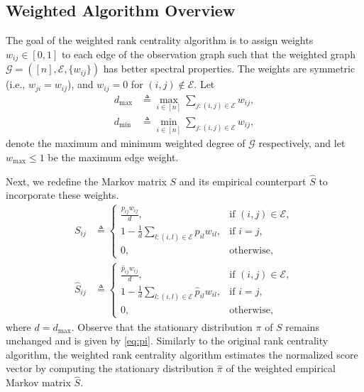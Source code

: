 \documentclass[sigconf,nonacm,pbalance]{acmart}
\begin{document}
\subsection{Weighted Algorithm Overview}\label{subsec:weighted-algorithm}
The goal of the weighted rank centrality algorithm is to assign weights $w_{ij} \in [0, 1]$ to each edge of the observation graph such that the weighted graph $\mathcal{G}=([n], \mathcal{E}, \{w_{ij}\})$ has better spectral properties. The weights are symmetric (i.e., $w_{ji}=w_{ij}$), and $w_{ij}=0$ for $(i, j) \notin \mathcal{E}$. Let
\begin{align}
    d_\text{max} &\triangleq \max_{i \in [n]} \sum_{j: (i, j) \in \mathcal{E}} w_{ij}, \\
    d_\text{min} &\triangleq \min_{i \in [n]} \sum_{j: (i, j) \in \mathcal{E}} w_{ij},
\end{align}
denote the maximum and minimum weighted degree of $\mathcal{G}$ respectively, and let $w_\text{max}\leq 1$ be the maximum edge weight.

Next, we redefine the Markov matrix $S$ and its empirical counterpart $\hat{S}$ to incorporate these weights.
\begin{align}
    S_{ij} &\triangleq \begin{cases}
        \frac{p_{ij} w_{ij}}{d}, & \text{if } (i, j) \in \mathcal{E}, \\
        1 - \frac{1}{d} \sum_{l: (i, l) \in \mathcal{E}} p_{il} w_{il}, & \text{if } i = j, \\
        0, & \text{otherwise,}
    \end{cases}\label{eq:weighted-S-definition} \\
    \hat{S}_{ij} &\triangleq \begin{cases}
        \frac{\hat{p}_{ij} w_{ij}}{d}, & \text{if } (i, j) \in \mathcal{E}, \\
        1 - \frac{1}{d} \sum_{l: (i, l) \in \mathcal{E}} \hat{p}_{il} w_{il}, & \text{if } i = j, \\
        0, & \text{otherwise,}
    \end{cases}\label{eq:weighted-S-hat-definition}
\end{align}
where $d=d_\text{max}$.
Observe that the stationary distribution $\pi$ of $S$ remains unchanged and is given by \cref{eq:pi}. Similarly to the original rank centrality algorithm, the weighted rank centrality algorithm estimates the normalized score vector by computing the stationary distribution $\hat{\pi}$ of the weighted empirical Markov matrix $\hat{S}$.
\end{document}
